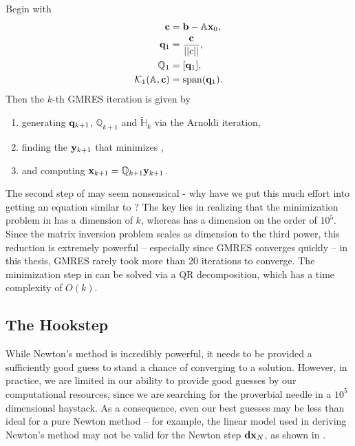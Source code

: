   \begin{algorithm}\label{alg:GMRES}
   Begin with
 \begin{align*}
 \mathbf{c} &= \mathbf{b} - \mathbb{A}\mathbf{x}_0,\\
  \mathbf{q}_1 &= \dfrac{\mathbf{c}}{||c||}, \\
  \mathbb{Q}_1 &= [\mathbf{q}_1],\\
  \mathcal{K}_1(\mathbb{A},\mathbf{c}) &= \mathrm{span}(\mathbf{q}_1).
  \end{align*}
  Then the $k$-th GMRES iteration is given by  
  \begin{enumerate}
  \item generating $\mathbf{q}_{k+1}$, $\mathbb{Q}_{k+1}$ and $\mathbb{\tilde{H}}_k$ via the Arnoldi iteration,
  \item finding the $\mathbf{y}_{k+1}$ that minimizes ,
  \item and computing $\mathbf{x}_{k+1} = \mathbb{Q}_{k+1}\mathbf{y}_{k+1}$.
  \end{enumerate}
  \end{algorithm}

 The second step of  may seem nonsensical - why have we put this much effort into getting an equation similar to ? The key lies in realizing that the minimization problem in   has a dimension of $k$, whereas  has a dimension on the order of $10^5$. Since the matrix inversion problem scales as dimension to the third power, this reduction is extremely powerful -- especially since GMRES converges quickly -- in this thesis, GMRES rarely took more than 20 iterations to converge. The minimization step in   can be solved via a QR decomposition, which has a time complexity of $O(k)$.  
 
 \subsection{The Hookstep}
 
 While Newton's method is incredibly powerful, it needs to be provided a sufficiently good guess to stand a chance of converging to a solution. However, in practice, we are limited in our ability to provide good guesses by our computational resources, since we are searching for the proverbial needle in a $10^5$ dimensional haystack. As a consequence, even our best guesses may be less than ideal for a pure Newton method -- for example, the linear model used in deriving Newton's method may not be valid for the Newton step $\mathbf{dx}_N$, as shown in . 

